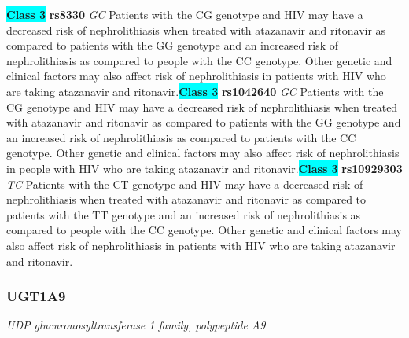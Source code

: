 \documentclass{report}
\begin{document}
\textbf{\colorbox{cyan} {Class 3}} \textbf{ rs8330 } \textit{ GC }
Patients with the CG genotype and HIV may have a decreased risk of nephrolithiasis when treated with atazanavir and ritonavir as compared to patients with the GG genotype and an increased risk of nephrolithiasis as compared to people with the CC genotype. Other genetic and clinical factors may also affect risk of nephrolithiasis in patients with HIV who are taking atazanavir and ritonavir.\newline\textbf{\colorbox{cyan} {Class 3}} \textbf{ rs1042640 } \textit{ GC }
Patients with the CG genotype and HIV may have a decreased risk of nephrolithiasis when treated with atazanavir and ritonavir as compared to patients with the GG genotype and an increased risk of nephrolithiasis as compared to patients with the CC genotype. Other genetic and clinical factors may also affect risk of nephrolithiasis in people with HIV who are taking atazanavir and ritonavir.\newline\textbf{\colorbox{cyan} {Class 3}} \textbf{ rs10929303 } \textit{ TC }
Patients with the CT genotype and HIV may have a decreased risk of nephrolithiasis when treated with atazanavir and ritonavir as compared to patients with the TT genotype and an increased risk of nephrolithiasis as compared to people with the CC genotype. Other genetic and clinical factors may also affect risk of nephrolithiasis in patients with HIV who are taking atazanavir and ritonavir. \newline\subsubsection{ UGT1A9 }
\textit{ UDP glucuronosyltransferase 1 family, polypeptide A9 }
\end{document}
